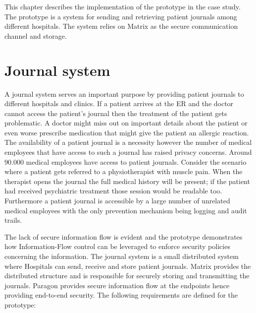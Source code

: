 

This chapter describes the implementation of the prototype in the case study. The prototype is a system for sending and retrieving patient journals among different hospitals. The system relies on Matrix as the secure communication channel and storage.


\section{Journal system}

A journal system serves an important purpose by providing patient journals to different hospitals and clinics. If a patient arrives at the ER and the doctor cannot access the patient's journal then the treatment of the patient gets problematic. A doctor might miss out on important details about the patient or even worse prescribe medication that might give the patient an allergic reaction. The availability of a patient journal is a necessity however the number of medical employees that have access to such a journal has raised privacy concerns. Around 90.000 medical employees have access to patient journals. Consider the scenario where a patient gets referred to a physiotherapist with muscle pain. When the therapist opens the journal the full medical history will be present; if the patient had received psychiatric treatment those session would be readable too. Furthermore a patient journal is accessible by a large number of unrelated medical employees with the only prevention mechanism being logging and audit trails.


The lack of secure information flow is evident and the prototype demonstrates how Information-Flow control can be leveraged to enforce security policies concerning the information. The journal system is a small distributed system where Hospitals can send, receive and store patient journals. Matrix provides the distributed structure and is responsible for securely storing and transmitting the journals. Paragon provides secure information flow at the endpoints hence providing end-to-end security. 
The following requirements are defined for the prototype:

